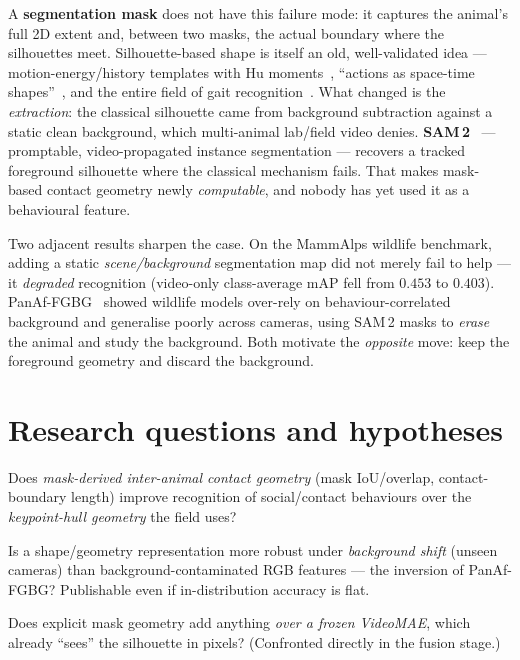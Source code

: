 \documentclass[11pt]{article}
\begin{document}
A \textbf{segmentation mask} does not have this failure mode: it captures the animal's full 2D
extent and, between two masks, the actual boundary where the silhouettes meet. Silhouette-based
shape is itself an old, well-validated idea — motion-energy/history templates with Hu
moments~\cite{bobickdavis}, ``actions as space-time shapes''~\cite{spacetimeshapes}, and the
entire field of gait recognition~\cite{gaitsurvey}. What changed is the \emph{extraction}: the
classical silhouette came from background subtraction against a static clean background, which
multi-animal lab/field video denies. \textbf{SAM\,2}~\cite{sam2} — promptable, video-propagated
instance segmentation — recovers a tracked foreground silhouette where the classical mechanism
fails. That makes mask-based contact geometry newly \emph{computable}, and nobody has yet used it
as a behavioural feature.

Two adjacent results sharpen the case. On the MammAlps wildlife benchmark, adding a static
\emph{scene/background} segmentation map did not merely fail to help — it \emph{degraded}
recognition (video-only class-average mAP fell from $0.453$ to $0.403$). PanAf-FGBG~\cite{panaf}
showed wildlife models over-rely on behaviour-correlated background and generalise poorly across
cameras, using SAM\,2 masks to \emph{erase} the animal and study the background. Both motivate
the \emph{opposite} move: keep the foreground geometry and discard the background.

\section{Research questions and hypotheses}
\begin{description}[leftmargin=2.4em,style=nextline]
  \item[RQ3 (primary)] Does \emph{mask-derived inter-animal contact geometry} (mask IoU/overlap,
    contact-boundary length) improve recognition of social/contact behaviours over the
    \emph{keypoint-hull geometry} the field uses?
  \item[RQ4 (insurance)] Is a shape/geometry representation more robust under \emph{background
    shift} (unseen cameras) than background-contaminated RGB features — the inversion of
    PanAf-FGBG? Publishable even if in-distribution accuracy is flat.
  \item[RQ1 (redundancy)] Does explicit mask geometry add anything \emph{over a frozen VideoMAE},
    which already ``sees'' the silhouette in pixels? (Confronted directly in the fusion stage.)
\end{description}
\end{document}
